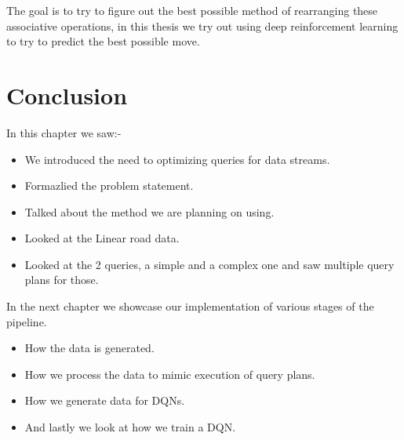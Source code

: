 The goal is to try to figure out the best possible method of rearranging these associative operations, in this thesis we try out using deep reinforcement learning to try to predict the best possible move.

\section{Conclusion}
In this chapter we saw:-
\begin{itemize}
    \item We introduced the need to optimizing queries for data streams.
    \item Formazlied the problem statement.
    \item Talked about the method we are planning on using.
    \item Looked at the Linear road data.
    \item Looked at the 2 queries, a simple and a complex one and saw multiple query plans for those.
\end{itemize}
In the next chapter we showcase our implementation of various stages of the pipeline.
\begin{itemize}
    \item How the data is generated.
    \item How we process the data to mimic execution of query plans.
    \item How we generate data for DQNs.
    \item And lastly we look at how we train a DQN.
\end{itemize}


